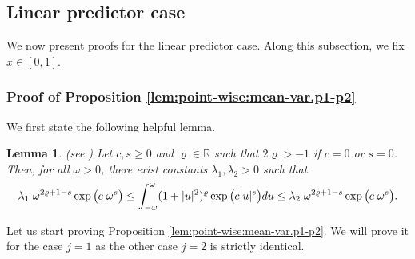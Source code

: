 \documentclass[11pt,a4paper,openany]{article}
\newtheorem{lem}[thm]{Lemma}
\def\R{\mathbb{R}}
\begin{document}
\subsection{Linear predictor case}
We now present proofs for the linear predictor case. Along this subsection, we fix $x \in [0,1]$.   
\subsubsection{Proof of Proposition \ref{lem:point-wise:mean-var.p1-p2}} \label{preuve-lem:point-wise:mean-var.p1-p2}

We first state the following helpful lemma.  
\begin{lem}(see  \cite[Lemma 1]{Comte-Lacour})
\label{lem:proof.of.lem:point-wise:mean-var.p1-p2:preliminary.lemma:bound.integral}
Let $c, s \geq 0$ and $\varrho \in \R$ such that $2 \varrho > -1$ if $c = 0$ or $s = 0$. Then, for all $\omega > 0$, there exist constants $\lambda_{1}, \lambda_{2} > 0$ such that   
\begin{align}
\lambda_{1} \hspace{0.1cm} \omega^{2\varrho + 1 - s} \exp \big( c  \hspace{0.1cm} \omega^{s} \big)  \leq  \int_{-\omega}^{\omega}  (1 + |u|^{2})^{\varrho} \exp \big( c |u|^{s} \big) du   \leq   \lambda_{2}  \hspace{0.1cm}    \omega^{2\varrho + 1 - s} \exp \big( c \hspace{0.1cm} \omega^{s} \big) .
\end{align}
\end{lem} 
Let us start proving Proposition  \ref{lem:point-wise:mean-var.p1-p2}.  We will prove it for the case $j=1$ as the other case $j=2$ is strictly identical. 
\end{document}
